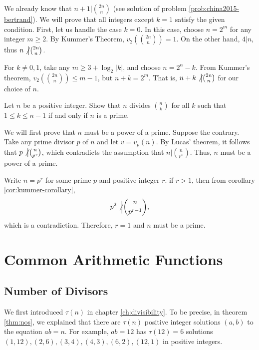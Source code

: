\documentclass[12pt]{subfile}
\begin{document}
\begin{solution}
	We already know that $n+1 \big| \binom{2n}{n}$ (see solution of problem \ref{prob:china2015-bertrand}). We will prove that all integers except $k=1$ satisfy the given condition. First, let us handle the case $k=0$. In this case, choose $n=2^m$ for any integer $m\geq 2$. By Kummer's Theorem, $v_2\left(\binom{2n}{n}\right)=1$. On the other hand, $4|n$, thus $	n \not \big| \binom{2n}{n}$.

	For $k \ne 0,1$, take any $m \geq 3 + {\log _2}\left| k \right|$, and choose $n = {2^\alpha } - k$. From Kummer's theorem, $v_2\left(\binom{2n}{n}\right) \leq m - 1$, but $n + k = {2^m}$. That is, $n+k \not \big| \binom{2n}{n}$ for our choice of $n$.
\end{solution}

\begin{problem}
	Let $n$ be a positive integer. Show that $n$ divides $\binom{n}{k}$ for all $k$ such that $1 \leq k \leq n-1$ if and only if $n$ is a prime.
\end{problem}

\begin{solution}
	We will first prove that $n$ must be a power of a prime. Suppose the contrary. Take any prime divisor $p$ of $n$ and let $v=v_p(n)$. By Lucas' theorem, it follows that $p \not\big| \binom{n}{p^v}$, which contradicts the assumption that $n \big| \binom{n}{p^v}$. Thus, $n$ must be a power of a prime.

	Write $n=p^r$ for some prime $p$ and positive integer $r$. if $r>1$, then from corollary \ref{cor:kummer-corollary},
	\begin{align*}
	p^2 \not \Big| \binom{n}{p^{r-1}},
	\end{align*}
	which is a contradiction. Therefore, $r=1$ and $n$ must be a prime.

\end{solution}

\section{Common Arithmetic Functions}
	\subsection{Number of Divisors}\label{sec:number-of-divisors}
		We first introduced $\tau(n)$ in chapter \ref{ch:divisibility}. To be precise, in theorem \ref{thm:nos}, we explained that there are $\tau(n)$ positive integer solutions $(a,b)$ to the equation $ab=n$. For example, $ab=12$ has $\tau(12)=6$ solutions $(1,12), (2, 6), (3,4), (4,3), (6,2), (12,1)$ in positive integers.
\end{document}
